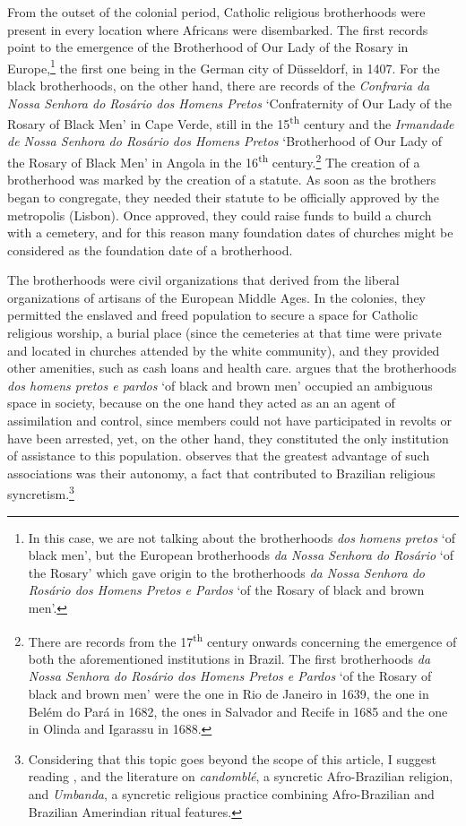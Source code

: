 \documentclass[output=paper,colorlinks,citecolor=brown]{langscibook}
\begin{document}
From the outset of the colonial period, Catholic religious brotherhoods were present in every location where Africans were disembarked. The first records point to the emergence of the Brotherhood of Our Lady of the Rosary in Europe,\footnote{In this case, we are not talking about the brotherhoods \emph{dos homens pretos} ‘of black men’, but the European brotherhoods \emph{da Nossa Senhora do Rosário} ‘of the Rosary’ which gave origin to the brotherhoods \emph{da Nossa Senhora do Rosário dos Homens Pretos e Pardos} ‘of the Rosary of black and brown men’.} the first one being in the German city of Düsseldorf, in 1407. For the black brotherhoods, on the other hand, there are records of the \emph{Confraria da Nossa Senhora do Rosário dos Homens Pretos} ‘Confraternity of Our Lady of the Rosary of Black Men’ in Cape Verde, still in the 15\textsuperscript{th} century and the \emph{Irmandade de Nossa Senhora do Rosário dos Homens Pretos} ‘Brotherhood of Our Lady of the Rosary of Black Men’ in Angola in the 16\textsuperscript{th} century.\footnote{There are records from the 17\textsuperscript{th} century onwards concerning the emergence of both the aforementioned institutions in Brazil. The first brotherhoods \emph{da Nossa Senhora do Rosário dos Homens Pretos e Pardos} ‘of the Rosary of black and brown men’ were the one in Rio de Janeiro in 1639, the one in Belém do Pará in 1682, the ones in Salvador and Recife in 1685 and the one in Olinda and Igarassu in 1688.} The creation of a brotherhood was marked by the creation of a statute. As soon as the brothers began to congregate, they needed their statute to be officially approved by the metropolis (Lisbon). Once approved, they could raise funds to build a church with a cemetery, and for this reason many foundation dates of churches might be considered as the foundation date of a brotherhood.

The brotherhoods were civil organizations that derived from the liberal organizations of artisans of the European Middle Ages. In the colonies, they permitted the enslaved and freed population to secure a space for Catholic religious worship, a burial place (since the cemeteries at that time were private and located in churches attended by the white community), and they provided other amenities, such as cash loans and health care. \citet{Assis_1998} argues that the brotherhoods \emph{dos homens pretos e pardos} ‘of black and brown men’ occupied an ambiguous space in society, because on the one hand they acted as an an agent of assimilation and control, since members could not have participated in revolts or have been arrested, yet, on the other hand, they constituted the only institution of assistance to this population. \citet{Quintao_2002} observes that the greatest advantage of such associations was their autonomy, a fact that contributed to Brazilian religious syncretism.\footnote{Considering that this topic goes beyond the scope of this article, I suggest reading \citet{Jurua_2011}, and the literature on \emph{candomblé}, a syncretic Afro-Brazilian religion, and \emph{Umbanda}, a syncretic religious practice combining Afro-Brazilian and Brazilian Amerindian ritual features.} 
\end{document}
